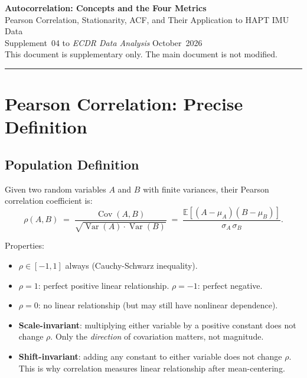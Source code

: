 \documentclass[11pt, a4paper]{article}
\theoremstyle{definition}
\theoremstyle{plain}
\newcommand{\E}{\mathbb{E}}
\newcommand{\Cov}{\operatorname{Cov}}
\newcommand{\Var}{\operatorname{Var}}
\begin{document}
\begin{center}
  {\LARGE\bfseries\color{teal} Autocorrelation: Concepts and the Four Metrics}\\[0.5em]
  {\large\color{muted} Pearson Correlation, Stationarity, ACF, and Their Application to HAPT IMU Data}\\[1.2em]
  {\normalsize Supplement~04 to \textit{ECDR Data Analysis} \textbar{} October~2026}\\[0.3em]
  {\small\color{muted} This document is supplementary only. The main document is not modified.}
\end{center}

\vspace{1em}\hrule\vspace{1em}

\tableofcontents
\clearpage

\section{Pearson Correlation: Precise Definition}

\subsection{Population Definition}

Given two random variables $A$ and $B$ with finite variances, their Pearson
correlation coefficient is:
\begin{equation}
  \rho(A, B) \;=\; \frac{\Cov(A, B)}{\sqrt{\Var(A) \cdot \Var(B)}}
  \;=\; \frac{\E[(A - \mu_A)(B - \mu_B)]}{\sigma_A \, \sigma_B}.
\end{equation}

Properties:
\begin{itemize}[leftmargin=1.5em]
  \item $\rho \in [-1, 1]$ always (Cauchy-Schwarz inequality).
  \item $\rho = 1$: perfect positive linear relationship. $\rho = -1$: perfect negative.
  \item $\rho = 0$: no linear relationship (but may still have nonlinear dependence).
  \item \textbf{Scale-invariant}: multiplying either variable by a positive constant
        does not change $\rho$. Only the \emph{direction} of covariation matters, not magnitude.
  \item \textbf{Shift-invariant}: adding any constant to either variable does not
        change $\rho$. This is why correlation measures linear relationship after
        mean-centering.
\end{itemize}
\end{document}
